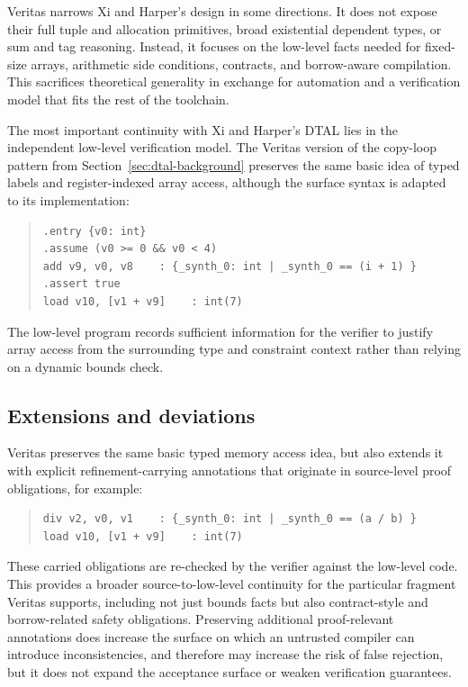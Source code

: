 Veritas narrows Xi and Harper's design in some directions. It does not expose their full tuple and allocation primitives, broad existential dependent types, or sum and tag reasoning. Instead, it focuses on the low-level facts needed for fixed-size arrays, arithmetic side conditions, contracts, and borrow-aware compilation. This sacrifices theoretical generality in exchange for automation and a verification model that fits the rest of the toolchain.

The most important continuity with Xi and Harper's DTAL lies in the independent low-level verification model. The Veritas version of the copy-loop pattern from Section~\ref{sec:dtal-background} preserves the same basic idea of typed labels and register-indexed array access, although the surface syntax is adapted to its implementation:

\begin{quote}
  \begin{verbatim}
.entry {v0: int}
.assume (v0 >= 0 && v0 < 4)
add v9, v0, v8    : {_synth_0: int | _synth_0 == (i + 1) }
.assert true
load v10, [v1 + v9]    : int(7)
\end{verbatim}
\end{quote}

The low-level program records sufficient information for the verifier to justify array access from the surrounding type and constraint context rather than relying on a dynamic bounds check.

\subsection{Extensions and deviations}


Veritas preserves the same basic typed memory access idea, but also extends it with explicit refinement-carrying annotations that originate in source-level proof obligations, for example:
\begin{quote}
  \begin{verbatim}
div v2, v0, v1    : {_synth_0: int | _synth_0 == (a / b) }
load v10, [v1 + v9]    : int(7)
  \end{verbatim}
\end{quote}
These carried obligations are re-checked by the verifier against the low-level code. This provides a broader source-to-low-level continuity for the particular fragment Veritas supports, including not just bounds facts but also contract-style and borrow-related safety obligations. Preserving additional proof-relevant annotations does increase the surface on which an untrusted compiler can introduce inconsistencies, and therefore may increase the risk of false rejection, but it does not expand the acceptance surface or weaken verification guarantees.

